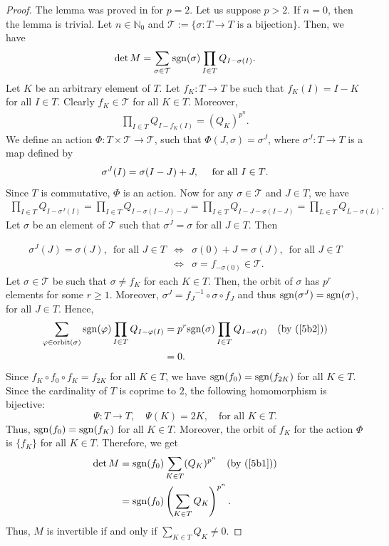 \documentclass[times,10pt]{amsart}
\newcommand{\N}{\ensuremath{\mathbb{N}}}
\renewcommand{\phi}{\varphi}
\begin{document}
\begin{proof} {The lemma was proved in \cite[Lemma 2.6]{AJ} for $p=2$}. Let us suppose $p> 2$. If $n=0$, then the lemma is trivial. Let $n\in \N_0$ and  $ \mathcal{T}:=\{ \sigma: T\xrightarrow{} T \text{ is a bijection}\}$. Then,  we have $$  \det M= \sum_{\sigma\in \mathcal{T}}{\rm sgn }(\sigma) \prod_{I\in T} Q_{I-\sigma(I)}.$$ Let $K$ be an arbitrary element of $T$. Let     $f_K: T\xrightarrow{} T$ be such that $ f_K( I)= I-K$ for all $I\in T$. Clearly $f_K\in \mathcal{T}$ for all $K\in T$. Moreover, \begin{align} \label{5b1}\prod_{I\in T} Q_{I-f_K(I)}=(Q_K)^{p^n}.\end{align}
    We define an  action  $\Phi: T\times  \mathcal{T}\xrightarrow{} \mathcal{T}$, such that $\Phi (J, \sigma)= \sigma^J$, where $ \sigma^J:T\xrightarrow{} T$ is a map defined by $$\sigma^J( I) = \sigma( I-J) +J,\quad \text{ for all $ I\in T$.}$$ Since $T$ is commutative, $\Phi$ is an action.  Now  for any $\sigma\in \mathcal{T}$ and  $ J\in T $, we have \begin{align}\label{5b2}
        \prod_{I\in T} Q_{I-\sigma^J(I)}=  \prod_{I\in T} Q_{I- \sigma(I-J)-J}= \prod_{I\in T} Q_{I-J- \sigma(I-J)}= \prod_{L\in T} Q_{L-\sigma(L)}.
    \end{align}  Let $\sigma$ be an  element of $\mathcal{T}$ such that  $\sigma^J=\sigma$ for all $J\in T$. Then  
    
    {\begin{eqnarray*}
        \sigma^J(J) =\sigma(J),\,\text{ for all } J\in T & \Longleftrightarrow & \sigma(0)+J = \sigma(J),\,\text{ for all } J\in T\\ &\Longleftrightarrow &  \sigma = f_{-\sigma(0)}\in \mathcal{T}.
    \end{eqnarray*}} Let $\sigma\in \mathcal{T}$ be such that $\sigma\neq f_K$ for each $K\in T$. Then, the orbit of $\sigma$ has $p^r$ elements for some $r\geq 1$. Moreover,  $\sigma^J= {f_J}^{-1}\circ \sigma\circ f_J$ and thus ${\rm sgn}(\sigma^J)= {\rm sgn}( \sigma)$, for all $J\in T$. Hence, \begin{align*}
         \sum_{\phi\in {\rm orbit}(\sigma)}{\rm sgn}(\phi) \prod_{I\in T} Q_{ I-\phi(I)}&=  p^r {\rm sgn}(\sigma) \prod_{I\in T} Q_{I-\sigma(I)}\quad (\text{by (\ref{5b2})})\\&=0. 
    \end{align*} Since   $ f_K\circ f_0\circ f_K= f_{2K}$ for all $K\in T$, we have  ${\rm sgn} (f_0)= {\rm sgn}(f_{2K})$ for all $K\in T$. Since   the cardinality of $T$ is {coprime} to $2$,  the following homomorphism is bijective: $$ \Psi: T\xrightarrow{}T,\quad \Psi(K)=2K, \quad \text{for all } K\in T.$$ Thus, $ {\rm sgn} (f_0)= {\rm sgn} (f_K)$ for all $K\in T$. Moreover, the orbit of $ f_K$ for the action $\Phi$ is $\{f_K\}$ for all $K\in T$. Therefore, we get \begin{align*}
         \det M&= {\rm sgn}(f_0) \sum_{K\in T}  (Q_K)^{p^n}\quad (\text{by (\ref{5b1})})\\&= {\rm sgn }(f_0) \left( \sum_{K\in T}Q_K\right)^{p^n}.
    \end{align*}Thus, $M$ is invertible if and only if $ \sum_{K\in T} Q_K\neq 0$.
\end{proof}
\end{document}
